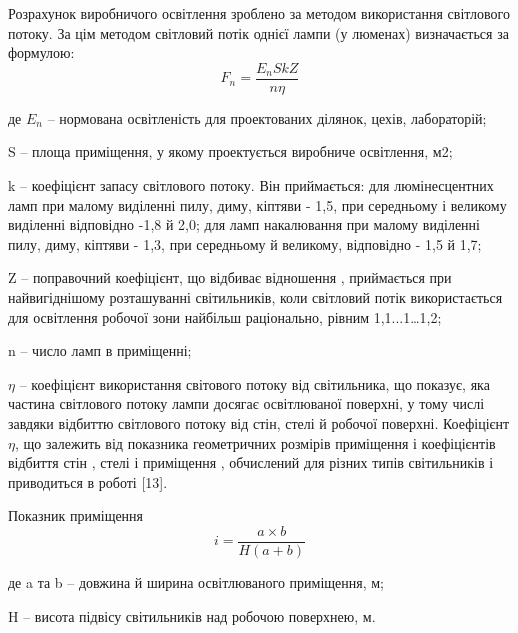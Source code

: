 \documentclass[ukrainian,utf8,simple,floatsubsection, hpadding=5mm,equationsubsection,]{eskdtext}
\begin{document}
Розрахунок виробничого освітлення зроблено за методом використання 
світлового потоку. За цім методом світловий потік однієї лампи (у люменах) визначається за формулою:
\begin{equation}
\label{eq:fnop}
 F_n = \frac{E_{n}SkZ}{n \eta}
\end{equation}
\begin{ESKDexplanation}
\item де $E_n$ -- нормована освітленість для проектованих ділянок, цехів, лабораторій;
\item S – площа приміщення, у якому проектується виробниче освітлення, м2;
\item k – коефіцієнт запасу світлового потоку. Він приймається: для люмінесцентних ламп при малому виділенні пилу, диму, кіптяви - 1,5, при середньому і великому виділенні відповідно -1,8 й 2,0; для ламп накалювання при малому виділенні пилу, диму, кіптяви - 1,3, при середньому й великому, відповідно - 1,5 й 1,7;
\item Z – поправочний коефіцієнт, що відбиває відношення  , приймається при найвигіднішому розташуванні світильників, коли світловий потік використається для освітлення робочої зони найбільш раціонально, рівним 1,1...1…1,2; 
\item n – число ламп в приміщенні;
\item  $\eta$ – коефіцієнт використання світового потоку від світильника, що показує, яка частина світлового потоку лампи   досягає освітлюваної поверхні, у тому числі завдяки відбиттю світлового потоку від стін, стелі й робочої поверхні.
Коефіцієнт $\eta$, що залежить від показника геометричних розмірів приміщення   і коефіцієнтів відбиття стін  , стелі   і приміщення  , обчислений для різних типів світильників і приводиться в роботі [13].	  
\end{ESKDexplanation}

Показник  приміщення
\begin{equation}
\label{eq:iop}
 i = \frac{a \times b}{H(a+b)}
\end{equation}
\begin{ESKDexplanation}
  \item де a та b – довжина й ширина освітлюваного приміщення, м;  
  \item H – висота підвісу світильників над робочою поверхнею, м.
\end{ESKDexplanation}
\end{document}
